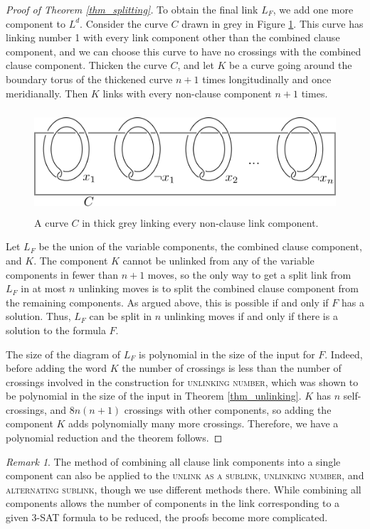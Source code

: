 \documentclass[12pt]{amsart}
\theoremstyle{definition}
\theoremstyle{remark}
\newtheorem{rem}[thm]{Remark}
\begin{document}
\begin{proof}[Proof of Theorem \ref{thm_splitting}]
To obtain the final link $L_F$, we add one more component to $L^d$.
Consider the curve $C$ drawn in grey in Figure \ref{fig_hopfdoublechain}.
This curve has linking number 1 with every link component other than the combined clause component, and we can choose this curve to have no crossings with the combined clause component.
Thicken the curve $C$, and let $K$ be a curve going around the boundary torus of the thickened curve $n+1$ times longitudinally and once meridianally.
Then $K$ links with every non-clause component $n+1$ times.
\begin{figure}[h]
\centering
\includegraphics[height=1.5in]{wdoublechain.png}
\caption{A curve $C$ in thick grey linking every non-clause link component.}
\label{fig_hopfdoublechain}
\end{figure}

Let $L_F$ be the union of the variable components, the combined clause component, and $K$.
The component $K$ cannot be unlinked from any of the variable components in fewer than $n+1$ moves, so the only way to get a split link from $L_F$ in at most $n$ unlinking moves is to split the combined clause component from the remaining components.
As argued above, this is possible if and only if $F$ has a solution.
Thus, $L_F$ can be split in $n$ unlinking moves if and only if there is a solution to the formula $F$.

The size of the diagram of $L_F$ is polynomial in the size of the input for $F$.
Indeed, before adding the word $K$ the number of crossings is less than the number of crossings involved in the construction for \textsc{unlinking number}, which was shown to be polynomial in the size of the input in Theorem \ref{thm_unlinking}.
$K$ has $n$ self-crossings, and $8n(n+1)$ crossings with other components, so adding the component $K$ adds polynomially many more crossings.
Therefore, we have a polynomial reduction and the theorem follows.
\end{proof}

\begin{rem}
The method of combining all clause link components into a single component can also be applied to the \textsc{unlink as a sublink}, \textsc{unlinking number}, and \textsc{alternating sublink}, though we use different methods there.
While combining all components allows the number of components in the link corresponding to a given 3-SAT formula to be reduced, the proofs become more complicated.
\end{rem}
\end{document}
